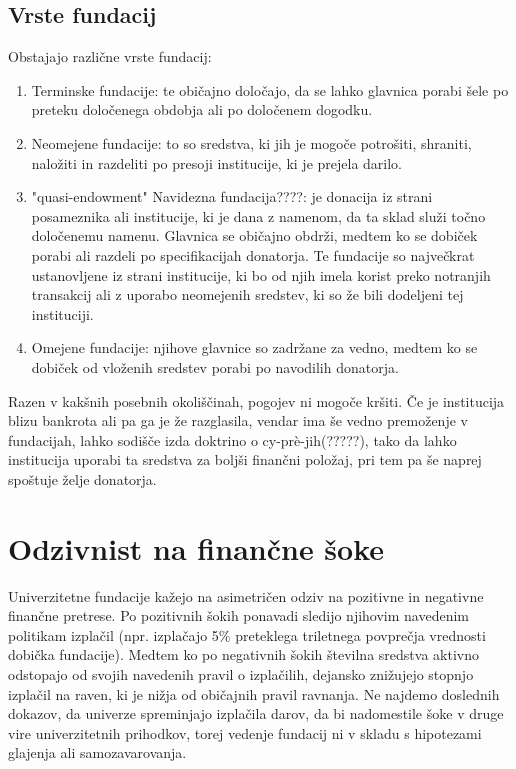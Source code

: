 \documentclass[12pt, a4paper]{article}
\begin{document}
\subsection{Vrste fundacij}
Obstajajo različne vrste fundacij:
\begin{enumerate}
\item Terminske fundacije: te običajno določajo, da se lahko glavnica porabi šele po preteku določenega obdobja ali po določenem dogodku.
\item Neomejene fundacije: to so sredstva, ki jih je mogoče potrošiti, shraniti, naložiti in razdeliti po presoji institucije, ki je prejela darilo.
\item "quasi-endowment" Navidezna fundacija????: je donacija iz strani posameznika ali institucije, ki je dana z namenom, da ta sklad služi točno določenemu namenu. Glavnica se običajno obdrži, medtem ko se dobiček porabi ali razdeli po specifikacijah donatorja. Te fundacije so največkrat ustanovljene iz strani institucije, ki bo od njih imela korist preko notranjih transakcij ali z uporabo neomejenih sredstev, ki so že bili dodeljeni tej instituciji.
\item Omejene fundacije: njihove glavnice so zadržane za vedno, medtem ko se dobiček od vloženih sredstev porabi po navodilih donatorja.
\end{enumerate}

Razen v kakšnih posebnih okoliščinah, pogojev ni mogoče kršiti. Če je institucija blizu bankrota ali pa ga je že razglasila, vendar ima še vedno premoženje v fundacijah, lahko sodišče izda doktrino o cy-prè-jih(?????), tako da lahko institucija uporabi ta sredstva za boljši finančni položaj, pri tem pa še naprej spoštuje želje donatorja.

\section[Odzivnost na finančne šoke]{Odzivnist na finančne šoke}

Univerzitetne fundacije kažejo na asimetričen odziv na pozitivne in negativne finančne pretrese. Po pozitivnih šokih ponavadi sledijo njihovim navedenim politikam izplačil (npr. izplačajo 5\% preteklega triletnega povprečja vrednosti dobička fundacije). Medtem ko po negativnih šokih številna sredstva aktivno odstopajo od svojih navedenih pravil o izplačilih, dejansko znižujejo stopnjo izplačil na raven, ki je nižja od običajnih pravil ravnanja. Ne najdemo doslednih dokazov, da univerze spreminjajo izplačila darov, da bi nadomestile šoke v druge vire univerzitetnih prihodkov, torej vedenje fundacij ni v skladu s hipotezami glajenja ali samozavarovanja.
\end{document}
